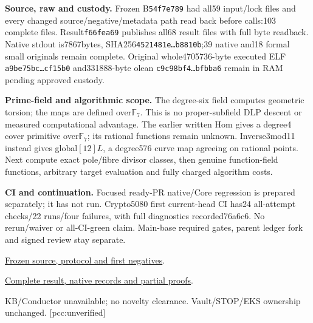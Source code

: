 \documentclass[10pt,a4paper]{article}
\begin{document}
\textbf{Source, raw and custody.} Frozen B\texttt{54f7e789} had all59
input/lock files and every changed source/negative/metadata path read
back before calls:103 complete files. Result\texttt{f66fea69} publishes
all68 result files with full byte readback. Native stdout is7867bytes,
SHA256\texttt{4521481e\ldots{}b8810b};39 native and18 formal small
originals remain complete. Original whole4705736-byte executed ELF
\texttt{a9be75bc\ldots{}cf15b0} and331888-byte olean
\texttt{c9c98bf4\ldots{}bfbba6} remain in RAM pending approved custody.

\textbf{Prime-field and algorithmic scope.} The degree-six field computes
geometric torsion; the maps are defined over$\mathbb F_7$. This is no
proper-subfield DLP descent or measured computational advantage. The
earlier written Hom gives a degree4 cover primitive over$\mathbb F_7$;
its rational functions remain unknown. Inverse3mod11 instead gives
global$[12]L$, a degree576 curve map agreeing on rational points.
Next compute exact pole/fibre divisor classes, then genuine function-field
functions, arbitrary target evaluation and fully charged algorithm costs.

\textbf{CI and continuation.} Focused ready-PR native/Core regression is
prepared separately; it has not run. Crypto5080 first current-head CI
has24 all-attempt checks/22 runs/four failures, with full diagnostics
recorded76a6c6. No rerun/waiver or all-CI-green claim. Main-base required
gates, parent ledger fork and signed review stay separate.

\href{https://github.com/isogeny-labs/cryptanalysis/tree/54f7e78915475c6a989dd486c1dc0f3e3f0a6ea7/research/chained_cm19_univariate_audit_20261123}{Frozen source, protocol and first negatives}.\par
\href{https://github.com/isogeny-labs/cryptanalysis/tree/f66fea690e4be44306786e66516b59a1a1b5d078/research/chained_cm19_univariate_audit_20261123}{Complete result, native records and partial proofs}.\par
KB/Conductor unavailable; no novelty clearance. Vault/STOP/EKS ownership
unchanged. [pcc:unverified]
\end{document}
